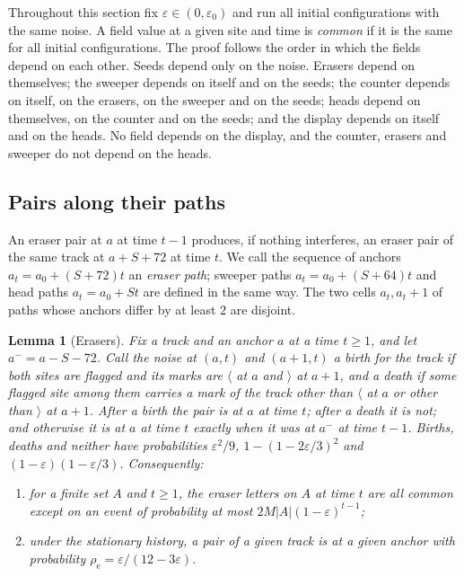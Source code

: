 \documentclass[11pt]{article}
\theoremstyle{plain}
\newtheorem{lemma}[theorem]{Lemma}
\theoremstyle{definition}
\theoremstyle{remark}
\newcommand{\eps}{\varepsilon}
\begin{document}
Throughout this section fix $\eps\in(0,\eps_0)$ and run all initial configurations with the same noise. A field value at a given site and time is \emph{common} if it is the same for all initial configurations. The proof follows the order in which the fields depend on each other. Seeds depend only on the noise. Erasers depend on themselves; the sweeper depends on itself and on the seeds; the counter depends on itself, on the erasers, on the sweeper and on the seeds; heads depend on themselves, on the counter and on the seeds; and the display depends on itself and on the heads. No field depends on the display, and the counter, erasers and sweeper do not depend on the heads.

\subsection{Pairs along their paths}

An eraser pair at $a$ at time $t-1$ produces, if nothing interferes, an eraser pair of the same track at $a+S+72$ at time $t$. We call the sequence of anchors $a_t=a_0+(S+72)t$ an \emph{eraser path}; sweeper paths $a_t=a_0+(S+64)t$ and head paths $a_t=a_0+St$ are defined in the same way. The two cells $a_t,a_t+1$ of paths whose anchors differ by at least $2$ are disjoint.

\begin{lemma}[Erasers]\label{lem:eraser}
Fix a track and an anchor $a$ at a time $t\ge1$, and let $a^-=a-S-72$. Call the noise at $(a,t)$ and $(a+1,t)$ a \emph{birth} for the track if both sites are flagged and its marks are $\langle$ at $a$ and $\rangle$ at $a+1$, and a \emph{death} if some flagged site among them carries a mark of the track other than $\langle$ at $a$ or other than $\rangle$ at $a+1$. After a birth the pair is at $a$ at time $t$; after a death it is not; and otherwise it is at $a$ at time $t$ exactly when it was at $a^-$ at time $t-1$. Births, deaths and neither have probabilities $\eps^2/9$, $1-(1-2\eps/3)^2$ and $(1-\eps)(1-\eps/3)$. Consequently:
\begin{enumerate}[label=(\roman*)]
\item for a finite set $A$ and $t\ge1$, the eraser letters on $A$ at time $t$ are all common except on an event of probability at most $2M|A|(1-\eps)^{t-1}$;
\item under the stationary history, a pair of a given track is at a given anchor with probability $\rho_{\mathrm e}=\eps/(12-3\eps)$.
\end{enumerate}
\end{lemma}
\end{document}
